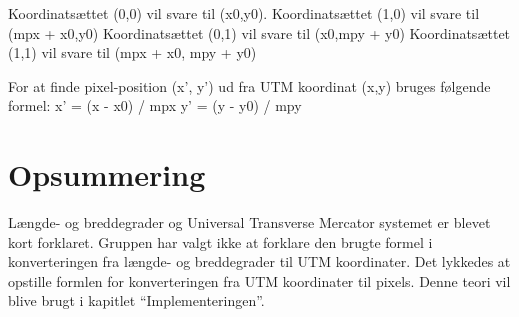Koordinatsættet (0,0) vil svare til (x0,y0).
Koordinatsættet (1,0) vil svare til (mpx + x0,y0)
Koordinatsættet (0,1) vil svare til (x0,mpy + y0)
Koordinatsættet (1,1) vil svare til (mpx + x0, mpy + y0)

For at finde pixel-position (x’, y’) ud fra UTM koordinat (x,y) bruges følgende formel:\newline
x’ = (x - x0) / mpx\newline
y’ = (y - y0) / mpy\newline

\section{Opsummering}
Længde- og breddegrader og Universal Transverse Mercator systemet er blevet kort forklaret. Gruppen har valgt ikke at forklare den brugte formel i konverteringen fra længde- og breddegrader til UTM koordinater. Det lykkedes at opstille formlen for konverteringen fra UTM koordinater til pixels. Denne teori vil blive brugt i kapitlet “Implementeringen”. 